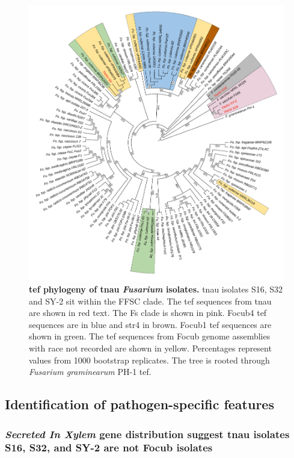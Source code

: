 \begin{figure}[htp!]
    \centering
    \includegraphics[width=14cm]{Figures/TEF1-aPhylo3.pdf}
    \caption[\Acl{tef} phylogeny of \acl{tnau} \textit{Fusarium} isolates.]{\textbf{\Acl{tef} phylogeny of \acl{tnau} \textit{Fusarium} isolates.} \Ac{tnau} isolates S16, S32 and SY-2 sit within the \acf{FFSC} clade. The \ac{tef} sequences from \ac{tnau} are shown in red text. The \acf{Fs} clade is shown in pink. \Acf{Focub4} \ac{tef} sequences are in blue and \acf{str4} in brown. \Acf{Focub1} \ac{tef} sequences are shown in green. The \ac{tef} sequences from \acf{Focub} genome assemblies with race not recorded are shown in yellow. Percentages represent values from 1000 bootstrap replicates. The tree is rooted through \textit{Fusarium graminearum} PH-1 \ac{tef}.}
    \label{fig:TEF1aPhylo}
\end{figure}
\bigskip

\subsection{Identification of pathogen-specific features}

\subsubsection{\textit{Secreted In Xylem} gene distribution suggest \ac{tnau} isolates S16, S32, and SY-2 are not \ac{Focub} isolates}

